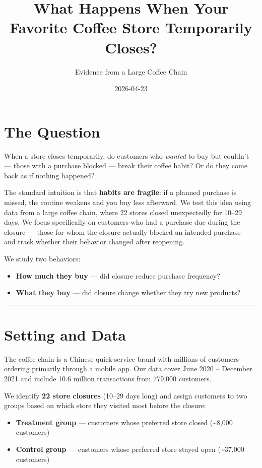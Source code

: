 \documentclass[
  letterpaper,
  DIV=11,
  numbers=noendperiod]{scrartcl}
\title{What Happens When Your Favorite Coffee Store Temporarily Closes?}
\subtitle{Evidence from a Large Coffee Chain}
\author{}
\date{2026-04-23}
\providecommand{\tightlist}{%
  \setlength{\itemsep}{0pt}\setlength{\parskip}{0pt}}
\begin{document}
\maketitle


\section{The Question}\label{the-question}

When a store closes temporarily, do customers who \emph{wanted} to buy
but couldn't --- those with a purchase blocked --- break their coffee
habit? Or do they come back as if nothing happened?

The standard intuition is that \textbf{habits are fragile}: if a planned
purchase is missed, the routine weakens and you buy less afterward. We
test this idea using data from a large coffee chain, where 22 stores
closed unexpectedly for 10--29 days. We focus specifically on customers
who had a purchase due during the closure --- those for whom the closure
actually blocked an intended purchase --- and track whether their
behavior changed after reopening.

We study two behaviors:

\begin{itemize}
\tightlist
\item
  \textbf{How much they buy} --- did closure reduce purchase frequency?
\item
  \textbf{What they buy} --- did closure change whether they try new
  products?
\end{itemize}

\begin{center}\rule{0.5\linewidth}{0.5pt}\end{center}

\section{Setting and Data}\label{setting-and-data}

The coffee chain is a Chinese quick-service brand with millions of
customers ordering primarily through a mobile app. Our data cover June
2020 -- December 2021 and include 10.6 million transactions from 779,000
customers.

We identify \textbf{22 store closures} (10--29 days long) and assign
customers to two groups based on which store they visited most before
the closure:

\begin{itemize}
\tightlist
\item
  \textbf{Treatment group} --- customers whose preferred store closed
  (\textasciitilde8,000 customers)
\item
  \textbf{Control group} --- customers whose preferred store stayed open
  (\textasciitilde37,000 customers)
\end{itemize}
\end{document}
